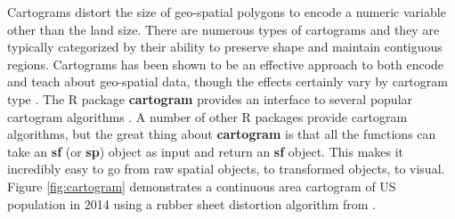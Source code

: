 \documentclass[
  12pt,
]{krantz}
\newenvironment{Shaded}{\begin{snugshade}}{\end{snugshade}}
\newcommand{\CharTok}[1]{\textcolor[rgb]{0.31,0.60,0.02}{#1}}
\newcommand{\DataTypeTok}[1]{\textcolor[rgb]{0.13,0.29,0.53}{#1}}
\newcommand{\DecValTok}[1]{\textcolor[rgb]{0.00,0.00,0.81}{#1}}
\newcommand{\KeywordTok}[1]{\textcolor[rgb]{0.13,0.29,0.53}{\textbf{#1}}}
\newcommand{\NormalTok}[1]{#1}
\newcommand{\OperatorTok}[1]{\textcolor[rgb]{0.81,0.36,0.00}{\textbf{#1}}}
\newcommand{\OtherTok}[1]{\textcolor[rgb]{0.56,0.35,0.01}{#1}}
\newcommand{\StringTok}[1]{\textcolor[rgb]{0.31,0.60,0.02}{#1}}
\begin{document}
Cartograms distort the size of geo-spatial polygons to encode a numeric variable other than the land size. There are numerous types of cartograms and they are typically categorized by their ability to preserve shape and maintain contiguous regions. Cartograms has been shown to be an effective approach to both encode and teach about geo-spatial data, though the effects certainly vary by cartogram type \citep{cartogram-vis}.
The R package \textbf{cartogram} provides an interface to several popular cartogram algorithms \citep{cartogram}. A number of other R packages provide cartogram algorithms, but the great thing about \textbf{cartogram} is that all the functions can take an \textbf{sf} (or \textbf{sp}) object as input and return an \textbf{sf} object. This makes it incredibly easy to go from raw spatial objects, to transformed objects, to visual. Figure \ref{fig:cartogram} demonstrates a continuous area cartogram of US population in 2014 using a rubber sheet distortion algorithm from \citet{Dougenik}.


\begin{Shaded}
\end{Shaded}
\end{document}
